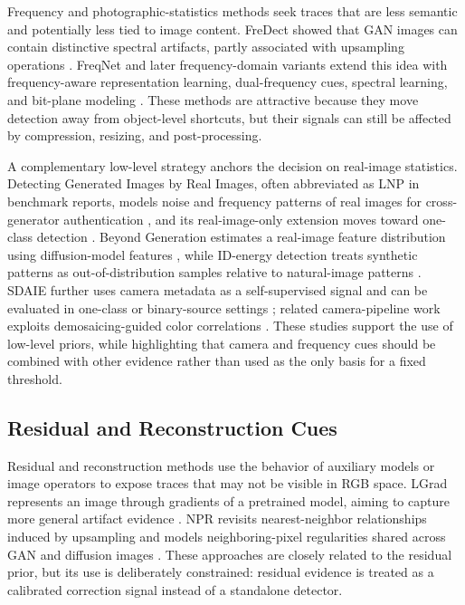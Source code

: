 \documentclass[letterpaper,journal]{IEEEtran}
\begin{document}
Frequency and photographic-statistics methods seek traces that are less semantic and potentially less tied to image content. FreDect showed that GAN images can contain distinctive spectral artifacts, partly associated with upsampling operations \cite{frank2020frequency}. FreqNet and later frequency-domain variants extend this idea with frequency-aware representation learning, dual-frequency cues, spectral learning, and bit-plane modeling \cite{tan2024freqnet,yan2025dffreq,karageorgiou2025spai,wang2025lota}. These methods are attractive because they move detection away from object-level shortcuts, but their signals can still be affected by compression, resizing, and post-processing.

A complementary low-level strategy anchors the decision on real-image statistics. Detecting Generated Images by Real Images, often abbreviated as LNP in benchmark reports, models noise and frequency patterns of real images for cross-generator authentication \cite{liu2022realimages}, and its real-image-only extension moves toward one-class detection \cite{bi2023realonly}. Beyond Generation estimates a real-image feature distribution using diffusion-model features \cite{zhong2025beyond}, while ID-energy detection treats synthetic patterns as out-of-distribution samples relative to natural-image patterns \cite{cai2025generalizable}. SDAIE further uses camera metadata as a self-supervised signal and can be evaluated in one-class or binary-source settings \cite{zhong2026metadata}; related camera-pipeline work exploits demosaicing-guided color correlations \cite{zhong2026color}. These studies support the use of low-level priors, while highlighting that camera and frequency cues should be combined with other evidence rather than used as the only basis for a fixed threshold.

\subsection{Residual and Reconstruction Cues}
Residual and reconstruction methods use the behavior of auxiliary models or image operators to expose traces that may not be visible in RGB space. LGrad represents an image through gradients of a pretrained model, aiming to capture more general artifact evidence \cite{tan2023lgrad}. NPR revisits nearest-neighbor relationships induced by upsampling and models neighboring-pixel regularities shared across GAN and diffusion images \cite{tan2024npr}. These approaches are closely related to the residual prior, but its use is deliberately constrained: residual evidence is treated as a calibrated correction signal instead of a standalone detector.
\end{document}
